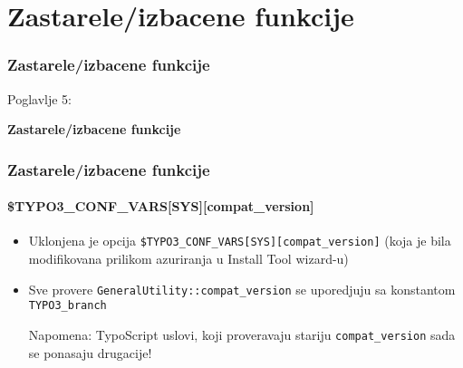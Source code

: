 %

\section{Zastarele/izbacene funkcije}
\begin{frame}[fragile]
	\frametitle{Zastarele/izbacene funkcije}

	\begin{center}\huge{Poglavlje 5:}\end{center}
	\begin{center}\huge{\color{typo3darkgrey}\textbf{Zastarele/izbacene funkcije}}\end{center}

\end{frame}


\begin{frame}[fragile]
	\frametitle{Zastarele/izbacene funkcije}
	\framesubtitle{\$TYPO3\_CONF\_VARS[SYS][compat\_version]}

	\begin{itemize}

		\item Uklonjena je opcija \texttt{\$TYPO3\_CONF\_VARS[SYS][compat\_version]} (koja je bila modifikovana prilikom azuriranja u Install Tool wizard-u)

		\item Sve provere \texttt{GeneralUtility::compat\_version} se uporedjuju sa konstantom \texttt{TYPO3\_branch}

			\vspace{0.2cm}

			\begingroup
				\color{red}
					Napomena: TypoScript uslovi, koji proveravaju stariju \texttt{compat\_version}
					sada se ponasaju drugacije!
			\endgroup

	\end{itemize}

\end{frame}

